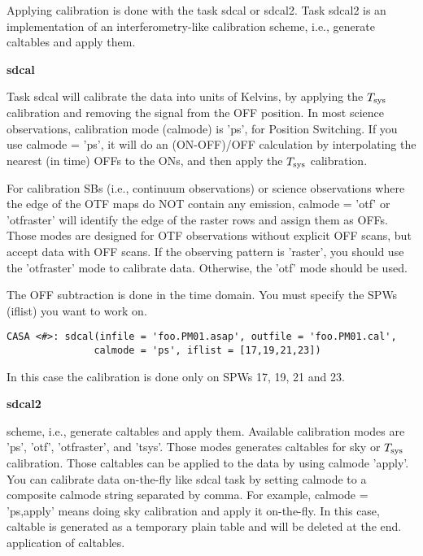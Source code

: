 Applying calibration is done with the task sdcal or sdcal2.  Task
sdcal2 is an implementation of an interferometry-like calibration
scheme, i.e., generate caltables and apply them.


{\bf sdcal}

Task sdcal will calibrate the data into units of Kelvins, by applying
the $T_{\rm sys}$ calibration and removing the signal from the OFF
position.  In most science observations, calibration mode (calmode) is
'ps', for Position Switching.  If you use calmode = 'ps', it will do
an (ON-OFF)/OFF calculation by interpolating the nearest (in time)
OFFs to the ONs, and then apply the $T_{\rm sys}$ calibration.

For calibration SBs (i.e., continuum observations) or science
observations where the edge of the OTF maps do NOT contain any
emission, calmode = 'otf' or 'otfraster' will identify the edge of the
raster rows and assign them as OFFs.  Those modes are designed for OTF
observations without explicit OFF scans, but accept data with OFF
scans.  If the observing pattern is 'raster', you should use the
'otfraster' mode to calibrate data.  Otherwise, the 'otf' mode should
be used.

The OFF subtraction is done in the time domain. 
You must specify the SPWs (iflist) you want to work on. 

\begin{verbatim}
CASA <#>: sdcal(infile = 'foo.PM01.asap', outfile = 'foo.PM01.cal', 
               calmode = 'ps', iflist = [17,19,21,23])
\end{verbatim}
In this case the calibration is done only on SPWs 17, 19, 21 and 23.


{\bf sdcal2}

scheme, i.e., generate caltables and apply them. 
Available calibration modes are 'ps', 'otf', 'otfraster', and 'tsys'.   
Those modes generates caltables for sky or $T_{\rm sys}$ calibration. 
Those caltables can be applied to the data by using calmode 'apply'. 
You can calibrate data on-the-fly like sdcal task by setting calmode to 
a composite calmode string separated by comma. 
For example, calmode = 'ps,apply' means doing sky calibration and apply 
it on-the-fly. 
In this case, caltable is generated as a temporary plain table and will 
be deleted at the end. 
application of caltables. 

